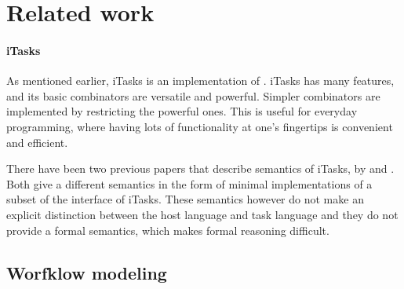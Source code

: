 


\section{Related work}
\label{sec:relatedwork}



\paragraph{iTasks}

As mentioned earlier, iTasks is an implementation of \TOP. iTasks has many
features, and its basic combinators are versatile and powerful. Simpler
combinators are implemented by restricting the powerful ones. This is useful for
everyday programming, where having lots of functionality at one's fingertips is
convenient and efficient.

There have been two previous papers that describe semantics of iTasks, by
\citet{conf/ifl/KoopmanPA08} and \citet{conf/ppdp/PlasmeijerLMAK12}.
Both give a different semantics in the form of minimal implementations of a
subset of the interface of iTasks. These semantics however do not make an
explicit distinction between the host language and task language and they do not
provide a formal semantics, which makes formal reasoning difficult.






\subsection{Worfklow modeling}

